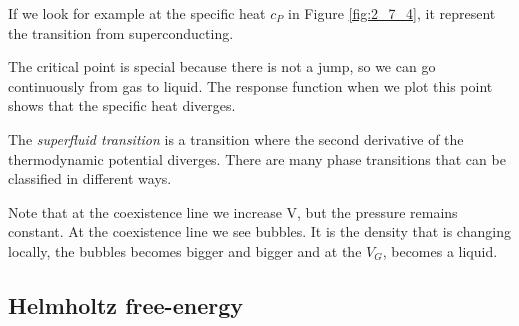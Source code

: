 \documentclass[../../Main/Main.tex]{subfiles}
\begin{document}
If we look for example at the specific heat \( c_P \) in Figure \ref{fig:2_7_4}, it represent the transition from superconducting.

The critical point is special because there is not a jump, so we can go continuously from gas to liquid. The response function when we plot this point shows that the specific heat diverges.

 The \emph{superfluid transition} is a transition where the second derivative of the thermodynamic potential diverges. There are many phase transitions that can be classified in different ways.

 \begin{remark}
Note that at the coexistence line we increase V, but the pressure remains constant. At the coexistence line we see bubbles. It is the density that is changing locally, the bubbles becomes bigger and bigger and at the \( V_G \), becomes a liquid.
 \end{remark}



\subsection{Helmholtz free-energy}
\end{document}
